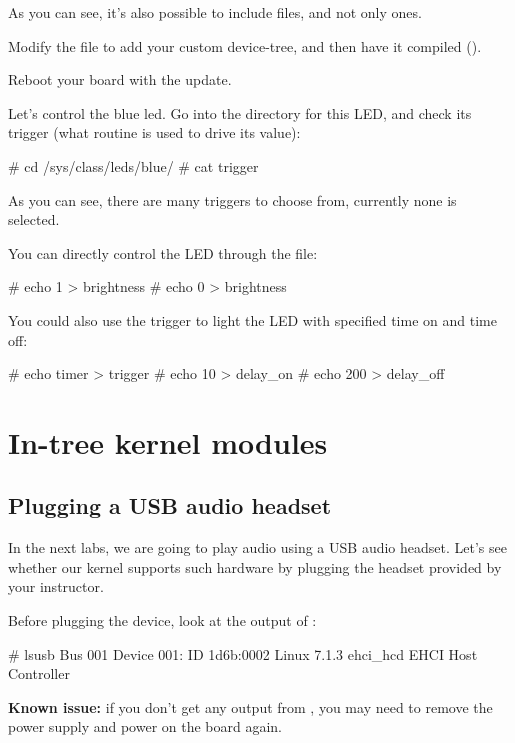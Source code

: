 As you can see, it's also possible to include  files, and not
only  ones.

Modify the  file to add your custom
device-tree, and then have it compiled ().

Reboot your board with the update.

Let's control the blue led. Go into the directory for this LED, and check its
trigger (what routine is used to drive its value):

\begin{bashinput}
# cd /sys/class/leds/blue/
# cat trigger
\end{bashinput}

As you can see, there are many triggers to choose from, currently none is
selected.

You can directly control the LED through the  file:

\begin{bashinput}
# echo 1 > brightness
# echo 0 > brightness
\end{bashinput}

You could also use the  trigger to light the LED
with specified time on and time off:

\begin{bashinput}
# echo timer > trigger
# echo 10 > delay_on
# echo 200 > delay_off
\end{bashinput}

\section{In-tree kernel modules}
\subsection{Plugging a USB audio headset}

In the next labs, we are going to play audio using a USB audio headset.
Let's see whether our kernel supports such hardware by plugging the
headset provided by your instructor.

Before plugging the device, look at the output of :

\begin{bashinput}
# lsusb
Bus 001 Device 001: ID 1d6b:0002 Linux 7.1.3 ehci_hcd EHCI Host Controller
\end{bashinput}

{\bf Known issue:} if you don't get any output from ,
you may need to remove the power supply and power on the board
again.

